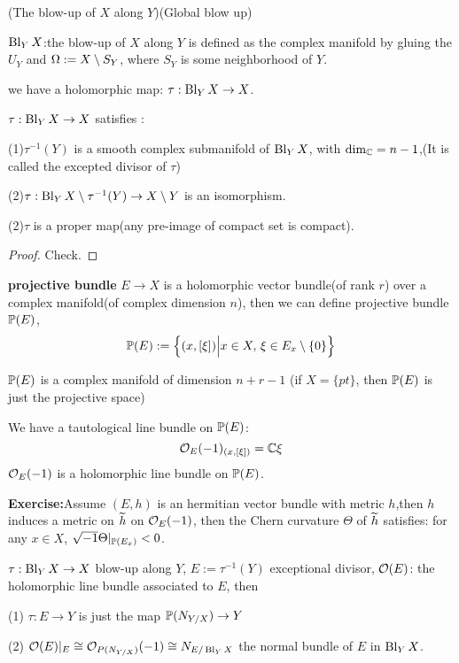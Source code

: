 \begin{definition}(The blow-up of $X$ along $Y$)(Global blow up)

$\operatorname{Bl}_YX$:the blow-up of $X$ along $Y$
is defined as the complex manifold by gluing the $U_Y$
and $\Omega:=X\setminus S_Y$,
where $S_Y$ is some neighborhood of $Y$.
\end{definition}

we have a holomorphic map: $\tau:\operatorname{Bl}_YX\to X$.

\begin{prop}
$\tau:\operatorname{Bl}_YX\to X$ satisfies :

(1)$\tau^{-1}(Y)$ is a smooth complex submanifold of $\operatorname{Bl}_YX$,
with $\dim_{\mathbb{C}}=n-1$,(It is called the excepted divisor of $\tau$)

(2)$\tau:\operatorname{Bl}_YX\setminus \tau^{-1}(Y)\to X\setminus Y$ is an isomorphism.

(2)$\tau$ is a proper map(any pre-image of compact set is compact).
\end{prop}

\begin{proof}
Check.
\end{proof}

\textbf{projective bundle} $E\to X$ is a holomorphic vector bundle(of rank $r$)
over a complex manifold(of complex dimension $n$),
then we can define projective bundle $\mathbb{P}(E)$,
$$\mathbb{P}(E):=\Big\{ (x,[\xi]) \Big| x\in X,\,\xi\in E_x\setminus\{0\} \Big\}$$

$\mathbb{P}(E)$ is a complex manifold of dimension $n+r-1$
(if $X=\{pt\}$, then $\mathbb{P}(E)$ is just the projective space)

We have a tautological line bundle on $\mathbb{P}(E)$:
$$\mathcal{O}_E(-1)_{(x,[\xi])}=\mathbb{C}\xi$$
$\mathcal{O}_E(-1)$ is a holomorphic line bundle on $\mathbb{P}(E)$.

\textbf{Exercise:}Assume $(E,h)$ is an hermitian vector bundle with
metric $h$,then $h$ induces a metric on $\widetilde{h}$ on $\mathcal{O}_E(-1)$,
then the Chern curvature $\Theta$ of $\widetilde{h}$ satisfies:
for any $x\in X$, $\sqrt{-1}\Theta|_{\mathbb{P}(E_x)}<0$.

\begin{thm}
  $\tau:\operatorname{Bl}_YX\to X$ blow-up along $Y$, $E:=\tau^{-1}(Y)$
exceptional divisor, $\mathcal{O}(E)$:
the holomorphic line bundle associated to $E$, then

(1) $\tau: E\to Y$ is just the map $\mathbb{P}(N_{Y/X})\to Y$

(2) $\mathcal{O}(E)|_E\cong \mathcal{O}_{P(N_{Y/X})}(-1)
\cong N_{E/\operatorname{Bl}_YX}$ the normal bundle of $E$ in $\operatorname{Bl}_YX$.
\end{thm}

